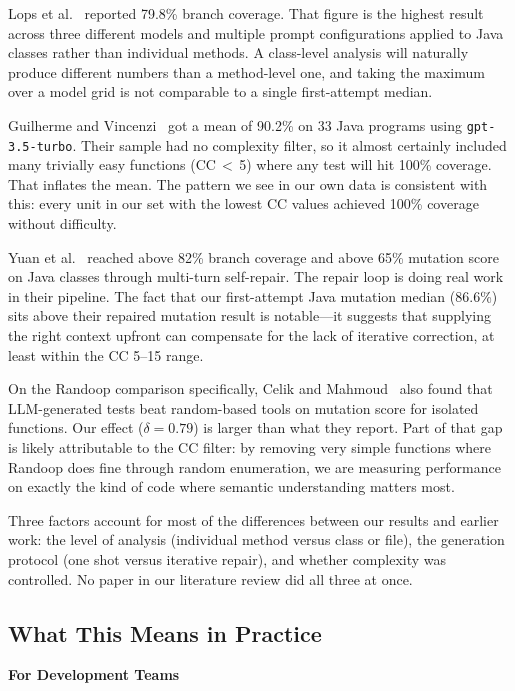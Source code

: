 \documentclass[conference]{IEEEtran}
\begin{document}
Lops et al.~\cite{lops2025agonetest} reported 79.8\% branch coverage. That figure is the highest result across three different models and multiple prompt configurations applied to Java classes rather than individual methods. A class-level analysis will naturally produce different numbers than a method-level one, and taking the maximum over a model grid is not comparable to a single first-attempt median.

Guilherme and Vincenzi~\cite{guilherme2023sast} got a mean of 90.2\% on 33 Java programs using \texttt{gpt-3.5-turbo}. Their sample had no complexity filter, so it almost certainly included many trivially easy functions (CC\,$<$\,5) where any test will hit 100\% coverage. That inflates the mean. The pattern we see in our own data is consistent with this: every unit in our set with the lowest CC values achieved 100\% coverage without difficulty.

Yuan et al.~\cite{yuan2024chattester} reached above 82\% branch coverage and above 65\% mutation score on Java classes through multi-turn self-repair. The repair loop is doing real work in their pipeline. The fact that our first-attempt Java mutation median (86.6\%) sits above their repaired mutation result is notable---it suggests that supplying the right context upfront can compensate for the lack of iterative correction, at least within the CC 5--15 range.

On the Randoop comparison specifically, Celik and Mahmoud~\cite{celik2026gem} also found that LLM-generated tests beat random-based tools on mutation score for isolated functions. Our effect ($\delta = 0.79$) is larger than what they report. Part of that gap is likely attributable to the CC filter: by removing very simple functions where Randoop does fine through random enumeration, we are measuring performance on exactly the kind of code where semantic understanding matters most.

Three factors account for most of the differences between our results and earlier work: the level of analysis (individual method versus class or file), the generation protocol (one shot versus iterative repair), and whether complexity was controlled. No paper in our literature review did all three at once.

\subsection{What This Means in Practice}
\label{sec:disc-implications}

\textbf{For Development Teams}
\end{document}
